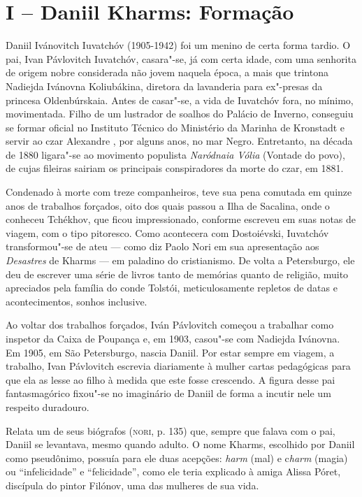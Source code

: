 \section{I -- Daniil Kharms: Formação}

Daniil Ivánovitch Iuvatchóv (1905-1942) foi um menino de certa forma
tardio. O pai, Ivan Pávlovitch Iuvatchóv, casara"-se, já com certa idade,
com uma senhorita de origem nobre considerada não jovem naquela época, a
mais que trintona Nadiejda Ivánovna Koliubákina, diretora da lavanderia
para ex"-presas da princesa Oldenbúrskaia. Antes de casar"-se, a vida de
Iuvatchóv fora, no mínimo, movimentada. Filho de um lustrador de soalhos
do Palácio de Inverno, conseguiu se formar oficial no Instituto Técnico
do Ministério da Marinha de Kronstadt e servir ao czar Alexandre ,
por alguns anos, no mar Negro. Entretanto, na década de 1880 ligara"-se
ao movimento populista \emph{Naródnaia Vólia} (Vontade do povo), de
cujas fileiras sairiam os principais conspiradores da morte do czar, em
1881.

Condenado à morte com treze companheiros, teve sua pena comutada em
quinze anos de trabalhos forçados, oito dos quais passou a Ilha de
Sacalina, onde o conheceu Tchékhov, que ficou impressionado, conforme
escreveu em suas notas de viagem, com o tipo pitoresco. Como acontecera
com Dostoiévski, Iuvatchóv transformou"-se de ateu --- como diz Paolo Nori
em sua apresentação aos \emph{Desastres} de Kharms --- em paladino do
cristianismo. De volta a Petersburgo, ele deu de escrever uma série de
livros tanto de memórias quanto de religião, muito apreciados pela
família do conde Tolstói, meticulosamente repletos de datas e
acontecimentos, sonhos inclusive.

Ao voltar dos trabalhos forçados, Iván Pávlovitch começou a trabalhar
como inspetor da Caixa de Poupança e, em 1903, casou"-se com Nadiejda
Ivánovna. Em 1905, em São Petersburgo, nascia Daniil. Por estar sempre
em viagem, a trabalho, Ivan Pávlovitch escrevia diariamente à mulher
cartas pedagógicas para que ela as lesse ao filho à medida que este
fosse crescendo. A figura desse pai fantasmagórico fixou"-se no
imaginário de Daniil de forma a incutir nele um respeito duradouro.

Relata um de seus biógrafos (\textsc{nori}, p. 135) que, sempre que
falava com o pai, Daniil se levantava, mesmo quando adulto. O nome
Kharms, escolhido por Daniil como pseudônimo, possuía para ele duas
acepções: \emph{harm} (mal) e c\emph{harm} (magia) ou ``infelicidade'' e
``felicidade'', como ele teria explicado à amiga Alissa Póret, discípula
do pintor Filónov, uma das mulheres de sua vida.

